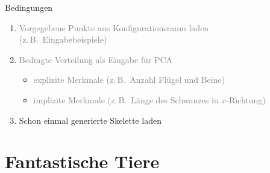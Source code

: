 \documentclass{beamer}
\newcommand{\zb}{z.\,B.\ }
\begin{document}
\begin{frame}{Bedingungen}
 \begin{enumerate}
  \item \textcolor{gray}{Vorgegebene Punkte aus Konfigurationsraum laden\\ (\zb Eingabebeispiele)}
  \item \textcolor{gray}{Bedingte Verteilung als Eingabe für PCA}
  \begin{itemize}
   \item \textcolor{gray}{explizite Merkmale (\zb Anzahl Flügel und Beine)}
   \item \textcolor{gray}{implizite Merkmale (\zb Länge des Schwanzes in $x$-Richtung)}
  \end{itemize}
  \item Schon einmal generierte Skelette laden
 \end{enumerate}
\end{frame}

\section{Fantastische Tiere}
\end{document}
